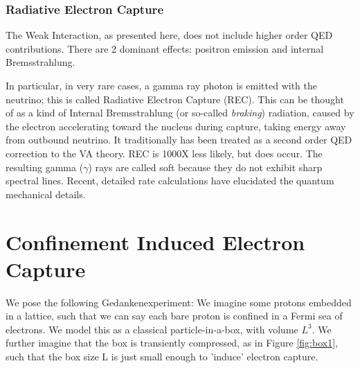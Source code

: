 \documentclass[%
 aip,
 jmp,%
 amsmath,amssymb,
 reprint,%
]{revtex4-1}
\begin{document}
\subsubsection{Radiative Electron Capture}

The Weak Interaction, as presented here, does not include higher order QED contributions.  There are 2 dominant effects: positron emission and internal Bremsstrahlung.\cite{Jauch}

In particular, in very rare cases, a gamma ray photon is emitted with the neutrino; this is called Radiative Electron Capture (REC).\cite{glauber1,glauber2, Jauch, roec2007} This can be thought of as a kind of Internal Bremsstrahlung (or so-called \emph{braking}) radiation, caused by the electron accelerating toward the nucleus during capture, taking energy away from outbound neutrino.\cite{jackson} It traditionally has been treated as a second order QED correction to the VA theory.\cite{Jauch}  REC is 1000X less likely, but does occur.   The resulting gamma ($\gamma$) rays are called soft because they do not exhibit sharp spectral lines.    Recent, detailed rate calculations have elucidated the quantum mechanical details.\cite{roec2007}


\section{Confinement Induced Electron Capture}

We pose the following Gedankenexperiment:   We imagine some protons embedded in a lattice, such that we can say each bare proton is confined in a Fermi sea of electrons. We model this as a classical particle-in-a-box, with volume $L^3$.   We further imagine that the box is transiently compressed, as in Figure \ref{fig:box1}, such that the box size L is just small enough to  'induce' electron capture.  
\end{document}
